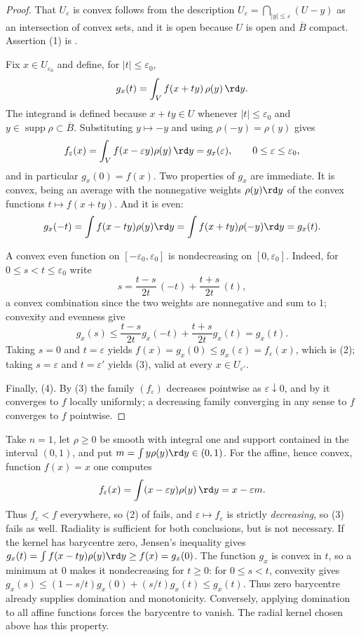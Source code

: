 \begin{proof}
That $U_\varepsilon$ is convex follows from the description
$U_\varepsilon=\bigcap_{|y|\leq\varepsilon}(U-y)$ as an intersection of
convex sets, and it is open because $U$ is open and $\overline B$ compact.
Assertion (1) is .

Fix $x\in U_{\varepsilon_0}$ and define, for $|t|\leq\varepsilon_0$,
\[
 g_x(t)=\int_Vf(x+ty)\,\rho(y)\,\rd y .
\]
The integrand is defined because $x+ty\in U$ whenever $|t|\leq\varepsilon_0$
and $y\in\operatorname{supp}\rho\subset\overline B$.  Substituting
$y\mapsto-y$ and using $\rho(-y)=\rho(y)$ gives
\[
 f_\varepsilon(x)=\int_Vf(x-\varepsilon y)\rho(y)\,\rd y=g_x(\varepsilon),
 \qquad 0\leq\varepsilon\leq\varepsilon_0,
\]
and in particular $g_x(0)=f(x)$.  Two properties of $g_x$ are immediate.  It
is convex, being an average with the nonnegative weights $\rho(y)\rd y$ of
the convex functions $t\mapsto f(x+ty)$.  And it is even:
\[
 g_x(-t)=\int f(x-ty)\rho(y)\rd y=\int f(x+ty)\rho(-y)\rd y=g_x(t).
\]

A convex even function on $[-\varepsilon_0,\varepsilon_0]$ is nondecreasing
on $[0,\varepsilon_0]$.  Indeed, for $0\leq s<t\leq\varepsilon_0$ write
\[
 s=\frac{t-s}{2t}\,(-t)+\frac{t+s}{2t}\,(t),
\]
a convex combination since the two weights are nonnegative and sum to $1$;
convexity and evenness give
\[
 g_x(s)\leq\frac{t-s}{2t}g_x(-t)+\frac{t+s}{2t}g_x(t)=g_x(t).
\]
Taking $s=0$ and $t=\varepsilon$ yields
$f(x)=g_x(0)\leq g_x(\varepsilon)=f_\varepsilon(x)$, which is (2); taking
$s=\varepsilon$ and $t=\varepsilon'$ yields (3), valid at every
$x\in U_{\varepsilon'}$.

Finally, (4).  By (3) the family $(f_\varepsilon)$ decreases pointwise as
$\varepsilon\downarrow0$, and by
 it converges to $f$ locally
uniformly; a decreasing family converging in any sense to $f$ converges to
$f$ pointwise.
\end{proof}

\begin{example}
\label{ex:ch09-nonradial-kernel}
Take $n=1$, let $\rho\geq0$ be smooth with
integral one and support contained in the interval $(0,1)$, and put
$m=\int y\rho(y)\rd y\in(0,1)$.  For the affine, hence convex, function
$f(x)=x$ one computes
\[
 f_\varepsilon(x)=\int(x-\varepsilon y)\rho(y)\,\rd y=x-\varepsilon m .
\]
Thus $f_\varepsilon<f$ everywhere, so (2) of
 fails, and
$\varepsilon\mapsto f_\varepsilon$ is strictly \emph{decreasing}, so (3)
fails as well.  Radiality is sufficient for both conclusions, but is not
necessary.  If the kernel has barycentre zero, Jensen's inequality gives
$g_x(t)=\int f(x-ty)\rho(y)\rd y\geq f(x)=g_x(0)$.  The function $g_x$ is
convex in $t$, so a minimum at $0$ makes it nondecreasing for $t\geq0$:
for $0\leq s<t$, convexity gives
$g_x(s)\leq(1-s/t)g_x(0)+(s/t)g_x(t)\leq g_x(t)$.
Thus zero barycentre already supplies domination and monotonicity.
Conversely, applying domination to all affine functions forces the
barycentre to vanish.  The radial kernel chosen above has this property.
\end{example}

